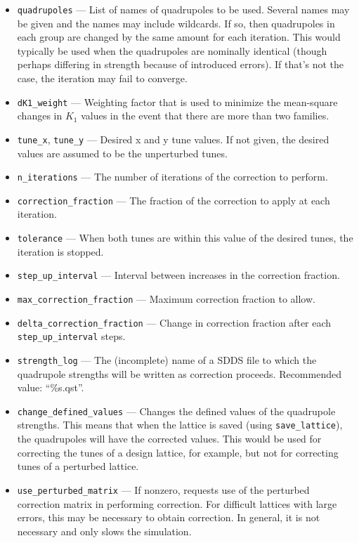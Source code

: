 \documentclass[11pt]{article}
\begin{document}
\begin{itemize}
\item \verb|quadrupoles| --- List of names of quadrupoles to be used.  Several names may be given and the names may include
  wildcards. If so, then quadrupoles in each group are changed by the same amount for each iteration.
  This would typically be used when the quadrupoles are nominally identical (though perhaps differing in strength because of
  introduced errors). If that's not the case, the iteration may fail to converge.
\item \verb|dK1_weight| --- Weighting factor that is used to minimize the mean-square changes in $K_1$ values in the
  event that there are more than two families.
\item \verb|tune_x|, \verb|tune_y| --- Desired x and y tune values.  If not given, the desired values are
assumed to be the unperturbed tunes.
\item \verb|n_iterations| --- The number of iterations of the correction to perform.
\item \verb|correction_fraction| --- The fraction of the correction to apply at each iteration.
\item \verb|tolerance| --- When both tunes are within this value of the desired tunes, the
iteration is stopped.
\item \verb|step_up_interval| --- Interval between increases in the correction fraction.
\item \verb|max_correction_fraction| --- Maximum correction fraction to allow.
\item \verb|delta_correction_fraction| --- Change in correction fraction after 
each \verb|step_up_interval| steps.
\item \verb|strength_log| --- The (incomplete) name of a SDDS file to which the quadrupole 
strengths will be written as correction proceeds.  Recommended value: ``\%s.qst''.
\item \verb|change_defined_values| --- Changes the defined values of the quadrupole strengths.
This means that when the lattice is saved (using \verb|save_lattice|), the quadrupoles will
have the corrected values.  This would be used for correcting the tunes of a design
lattice, for example, but not for correcting tunes of a perturbed lattice.
\item \verb|use_perturbed_matrix| --- If nonzero, requests use of the perturbed correction matrix in
performing correction.  For difficult lattices with large errors, this may be necessary
to obtain correction.  In general, it is not necessary and only slows the simulation.
\end{itemize}
\end{document}

